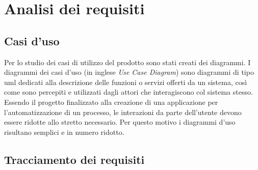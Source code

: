 
\chapter{Analisi dei requisiti}
\label{cap:analisi-requisiti}


\section{Casi d'uso}

Per lo studio dei casi di utilizzo del prodotto sono stati creati dei diagrammi.
I diagrammi dei casi d'uso (in inglese \emph{Use Case Diagram}) sono diagrammi di tipo \gls{uml} dedicati alla descrizione delle funzioni o servizi offerti da un sistema, così come sono percepiti e utilizzati dagli attori che interagiscono col sistema stesso.
Essendo il progetto finalizzato alla creazione di una applicazione per l'automatizzazione di un processo, le interazioni da parte dell'utente devono essere ridotte allo stretto necessario. Per questo motivo i diagrammi d'uso risultano semplici e in numero ridotto.
\newpage








\section{Tracciamento dei requisiti}

